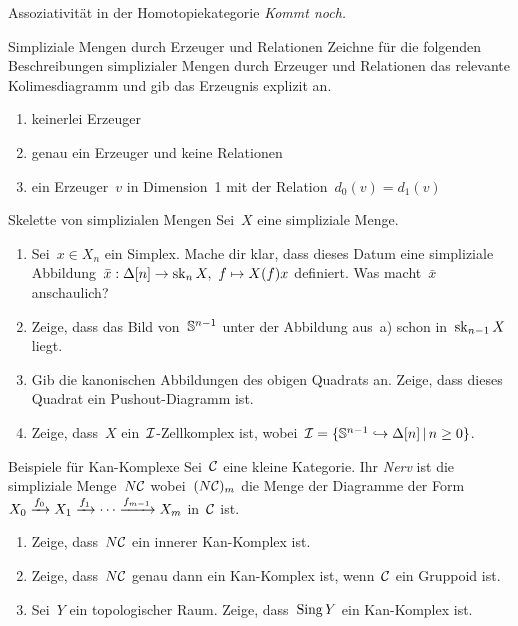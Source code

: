 \documentclass{uebblatt}
\begin{document}

\begin{aufgabe}{Assoziativität in der Homotopiekategorie}
\emph{Kommt noch.}
\end{aufgabe}

\begin{aufgabe}{Simpliziale Mengen durch Erzeuger und Relationen}
Zeichne für die folgenden Beschreibungen simplizialer Mengen durch Erzeuger und
Relationen das relevante Kolimesdiagramm und gib das Erzeugnis explizit an.
\begin{enumerate}
\item keinerlei Erzeuger
\item genau ein Erzeuger und keine Relationen
\item ein Erzeuger~$v$ in Dimension~1 mit der Relation~$d_0(v) = d_1(v)$
\end{enumerate}
\end{aufgabe}

\begin{aufgabe}{Skelette von simplizialen Mengen}
Sei~$X$ eine simpliziale Menge.

\begin{enumerate}
\item Sei~$x \in X_n$ ein Simplex. Mache dir
klar, dass dieses Datum eine simpliziale Abbildung~$\bar x : \Delta[n] \to \operatorname{sk}_n
X,\ f \mapsto X(f)x$ definiert. Was macht~$\bar x$ anschaulich?
\item Zeige, dass das Bild von~$\mathbb{S}^{n-1}$ unter der Abbildung
aus~a) schon in~$\operatorname{sk}_{n-1} X$ liegt.
\item Gib die kanonischen Abbildungen des obigen Quadrats an.
Zeige, dass dieses Quadrat ein Pushout-Diagramm ist.
\item Zeige, dass~$X$ ein~$\mathcal{I}$-Zellkomplex ist, wobei~$\mathcal{I} = \{ \mathbb{S}^{n-1}
\hookrightarrow \Delta[n] \,|\, n \geq 0 \}$.
\end{enumerate}
\end{aufgabe}

\begin{aufgabe}{Beispiele für Kan-Komplexe}
Sei~$\mathcal{C}$ eine kleine Kategorie. Ihr \emph{Nerv} ist die simpliziale Menge~$N\mathcal{C}$
wobei~$(N\mathcal{C})_m$ die Menge der Diagramme der Form $X_0 \xrightarrow{f_0} X_1 \xrightarrow{f_1}
\cdots \xrightarrow{f_{m-1}} X_m$ in~$\mathcal{C}$ ist.
\begin{enumerate}
\item Zeige, dass~$N\mathcal{C}$ ein innerer Kan-Komplex ist.
\item Zeige, dass~$N\mathcal{C}$ genau dann ein Kan-Komplex ist, wenn~$\mathcal{C}$ ein Gruppoid
ist.
\item Sei~$Y$ ein topologischer Raum. Zeige, dass~$\operatorname{Sing} Y$ ein Kan-Komplex
ist.
\end{enumerate}
\end{aufgabe}
\end{document}
